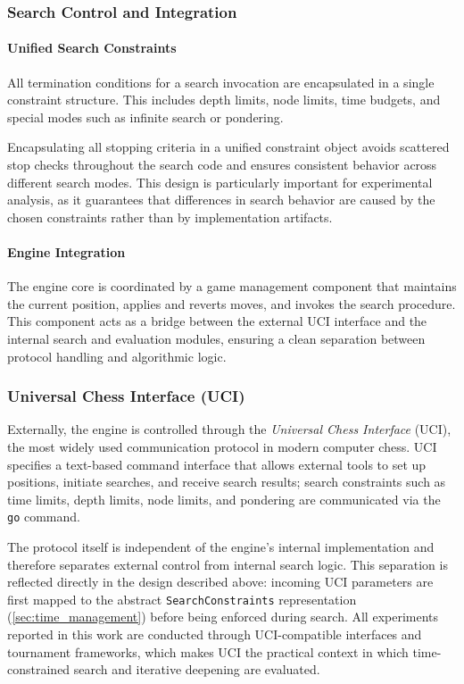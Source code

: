 \subsubsection{Search Control and Integration}

\paragraph{Unified Search Constraints}
All termination conditions for a search invocation are encapsulated in a single
constraint structure. This includes depth limits, node limits, time budgets, and
special modes such as infinite search or pondering.

Encapsulating all stopping criteria in a unified constraint object avoids
scattered stop checks throughout the search code and ensures consistent behavior
across different search modes. This design is particularly important for
experimental analysis, as it guarantees that differences in search behavior are
caused by the chosen constraints rather than by implementation artifacts.

\paragraph{Engine Integration}
The engine core is coordinated by a game management component that maintains the
current position, applies and reverts moves, and invokes the search procedure.
This component acts as a bridge between the external UCI interface and the
internal search and evaluation modules, ensuring a clean separation between
protocol handling and algorithmic logic.

\subsubsection{Universal Chess Interface (UCI)}
\label{subsec:uci}

Externally, the engine is controlled through the \emph{Universal Chess Interface}
(UCI), the most widely used communication protocol in modern computer chess. UCI
specifies a text-based command interface that allows external tools to set up
positions, initiate searches, and receive search results; search constraints such
as time limits, depth limits, node limits, and pondering are communicated via the
\texttt{go} command.

The protocol itself is independent of the engine's internal implementation and
therefore separates external control from internal search logic. This separation
is reflected directly in the design described above: incoming UCI parameters are
first mapped to the abstract \texttt{SearchConstraints} representation
(\cref{sec:time_management}) before being enforced during search. All experiments
reported in this work are conducted through UCI-compatible interfaces and
tournament frameworks, which makes UCI the practical context in which
time-constrained search and iterative deepening are evaluated.

